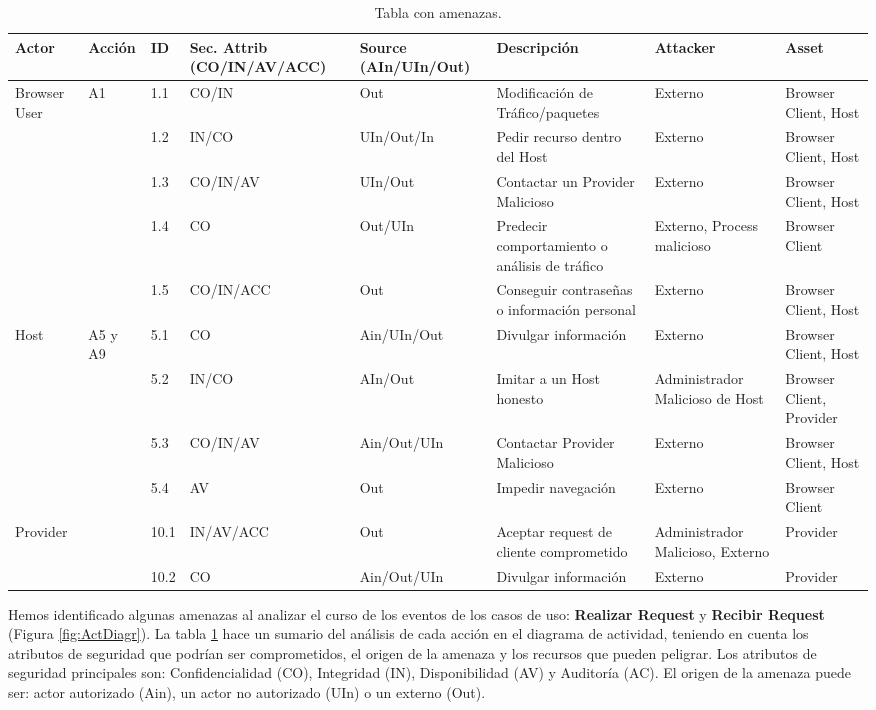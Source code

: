 \begin{landscape}%
\begin{table}[h!t]
\caption{Tabla con amenazas.}
\centering
\begin{tabular}{ |m{3.5em}|m{2.5em}|m{1.5em}|m{6em}|m{6em}|m{10em}|m{6em}|m{7em}|} 
\hline
Actor & Acción & ID & Sec. Attrib (CO/IN/AV/ACC) & Source (AIn/UIn/Out) & Descripción & Attacker & Asset\\
\hline
\multirow{5}{1em}{Browser User} & \multirow{5}{1em}{A1} & 1.1 & CO/IN & Out & Modificación de Tráfico/paquetes & Externo & Browser Client, Host\\ 
& & 1.2 & IN/CO & UIn/Out/In & Pedir recurso dentro del Host & Externo & Browser Client, Host\\
& & 1.3 & CO/IN/AV & UIn/Out & Contactar un Provider Malicioso & Externo & Browser Client, Host\\
& & 1.4 & CO & Out/UIn & Predecir comportamiento o análisis de tráfico & Externo, Process malicioso & Browser Client\\
& & 1.5 & CO/IN/ACC & Out & Conseguir contraseñas o información personal & Externo & Browser Client, Host\\
\hline
\multirow{4}{1em}{Host} & \multirow{5}{1em}{A5 y A9} & 5.1 & CO & Ain/UIn/Out & Divulgar información & Externo & Browser Client, Host\\ 
& & 5.2 & IN/CO & AIn/Out & Imitar a un Host honesto & Administrador Malicioso de Host & Browser Client, Provider\\
& & 5.3 & CO/IN/AV & Ain/Out/UIn & Contactar Provider Malicioso & Externo & Browser Client, Host\\
& & 5.4 & AV & Out & Impedir navegación & Externo & Browser Client\\
\hline
\multirow{2}{1em}{Provider} & \multirow{5}{1em}{A10} & 10.1 & IN/AV/ACC & Out & Aceptar request de cliente comprometido & Administrador Malicioso, Externo & Provider\\ 
& & 10.2 & CO & Ain/Out/UIn & Divulgar información & Externo & Provider\\

\hline
\end{tabular}
\label{tab:threats}
\end{table}
\end{landscape}

Hemos identificado algunas amenazas al analizar el curso de los eventos de los casos de uso: \textbf{Realizar Request} y \textbf{Recibir Request} (Figura \ref{fig:ActDiagr}). La tabla \ref{tab:threats} hace un sumario del análisis de cada acción en el diagrama de actividad, teniendo en cuenta los atributos de seguridad que podrían ser comprometidos, el origen de la amenaza y los recursos que pueden peligrar. Los atributos de seguridad principales son: Confidencialidad (CO), Integridad (IN), Disponibilidad (AV) y Auditoría (AC). El origen de la amenaza puede ser: actor autorizado (Ain), un actor no autorizado (UIn) o un externo (Out).


